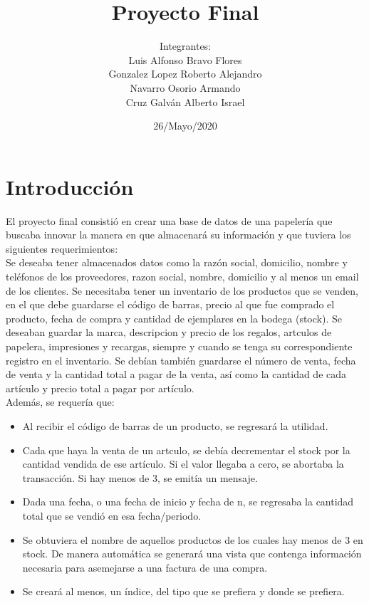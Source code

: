 \documentclass[10pt]{report}
\title{\textbf{Proyecto Final}}
\author{Integrantes:\\
Luis Alfonso Bravo Flores\\
Gonzalez Lopez Roberto Alejandro\\
Navarro Osorio Armando\\
Cruz Galván Alberto Israel} %
\date{26/Mayo/2020}
\begin{document}
\maketitle




\chapter*{Introducción}

El proyecto final consistió en crear una base de datos de una papelería que buscaba innovar la manera en que almacenará su información y que tuviera los siguientes requerimientos:\\

Se deseaba tener almacenados datos como la razón social, domicilio, nombre
y teléfonos de los proveedores, razon social, nombre, domicilio y al menos un
email de los clientes. Se necesitaba tener un inventario de los productos que se
venden, en el que debe guardarse el código de barras, precio al que fue comprado
el producto, fecha de compra y cantidad de ejemplares en la bodega (stock).
Se deseaban guardar la marca, descripcion y precio de los regalos, artculos de
papelera, impresiones y recargas, siempre y cuando se tenga su correspondiente
registro en el inventario. Se debían también guardarse el número de venta, fecha de
venta y la cantidad total a pagar de la venta, así como la cantidad de cada
artículo y precio total a pagar por artículo. \\

Además, se requería que:

\begin{itemize}

\item Al recibir el código de barras de un producto, se regresará la utilidad.

\item Cada que haya la venta de un artculo, se debía decrementar el stock por
la cantidad vendida de ese artículo. Si el valor llegaba a cero, se abortaba la
transacción. Si hay menos de 3, se emitía un mensaje.

\item Dada una fecha, o una fecha de inicio y fecha de n, se regresaba la cantidad total que se vendió en esa fecha/periodo.

\item Se obtuviera el nombre de aquellos productos de los cuales hay menos de 3 en stock. De manera automática se generará una vista que contenga información necesaria para asemejarse a una factura de una compra.

\item Se creará al menos, un índice, del tipo que se prefiera y donde se prefiera. 

\end{itemize}
\end{document}
